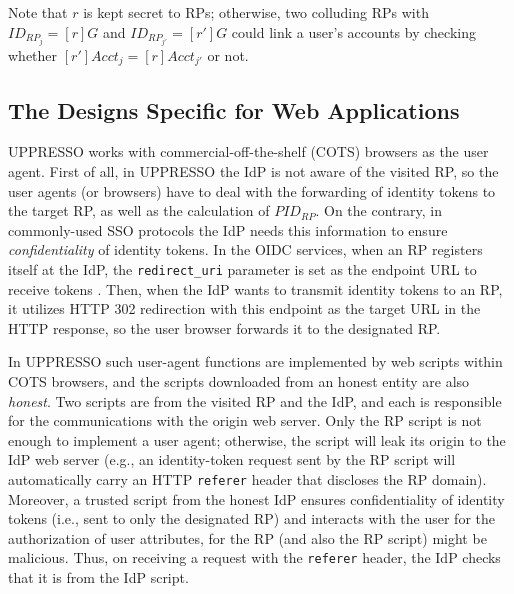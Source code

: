 Note that $r$ is kept secret to RPs; otherwise, two colluding RPs with $ID_{RP_j} = [r]G$ and $ID_{RP_{j'}} = [r']G$ could link a user's accounts by checking whether $[r']Acct_j = [r]Acct_{j'}$ or not.

\subsection{The Designs Specific for Web Applications}
\label{sec:web-design}
UPPRESSO works with commercial-off-the-shelf (COTS) browsers as the user agent. %
%
First of all, in UPPRESSO the IdP is not aware of the visited RP,
 so the user agents (or browsers) have to deal with the forwarding of identity tokens
    to the target RP, as well as the calculation of $PID_{RP}$.
On the contrary,
    in commonly-used SSO protocols \cite{OpenIDConnect,rfc6749,SAML,SAMLIdentifier} the IdP needs this information to ensure \emph{confidentiality} of identity tokens.
In the OIDC services, when an RP registers itself at the IdP, the \verb+redirect_uri+ parameter
    is set as the endpoint URL to receive tokens  \cite{OpenIDConnect}.
Then, %
 when the IdP wants to transmit identity tokens to an RP,
    it utilizes HTTP 302 redirection with this endpoint as the target URL in the HTTP response,
     so the user browser forwards it to the designated RP.

In UPPRESSO such user-agent functions are implemented by web scripts within COTS browsers,
and the scripts downloaded from an honest entity are also \emph{honest}.
Two scripts are from the visited RP and the IdP, %
    and each is responsible for the communications with the origin web server.
Only the RP script is not enough to implement a user agent;
    otherwise, the script will leak its origin to the IdP web server
    (e.g.,
    an identity-token request sent by the RP script will
automatically carry an HTTP \verb+referer+ header that discloses the RP domain).
Moreover, a trusted script from the honest IdP
ensures confidentiality of identity tokens (i.e., sent to only the designated RP)
and interacts with the user for the authorization of user attributes,
    for the RP (and also the RP script) might be malicious.
Thus, on receiving a request with the \verb+referer+ header,
    the IdP checks that it is from the IdP script.


